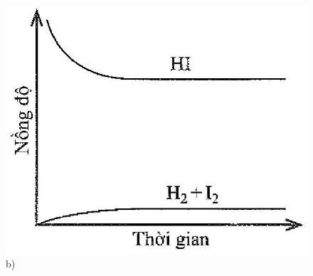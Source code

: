 \documentclass[10pt]{article}
\begin{document}
\begin{figure}[h]
\begin{center}
  \includegraphics[width=\textwidth]{2025_10_23_f2823ef970776205e47bg-02}
\captionsetup{labelformat=empty}
\caption{b)}
\end{center}
\end{figure}
\end{document}
